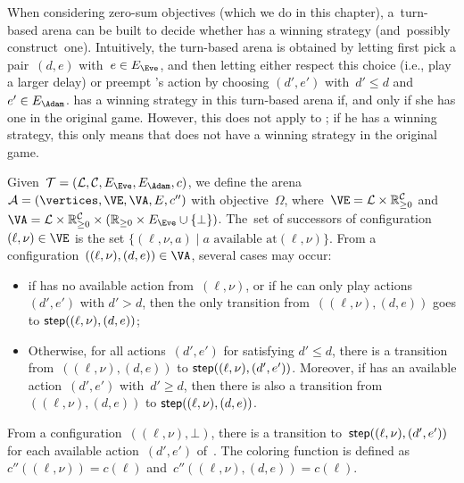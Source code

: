 \begin{remark}
  When considering zero-sum objectives (which we do in this chapter),
a~turn-based arena can be built to decide whether \Eve has a winning
strategy (and~possibly construct~one).  Intuitively, the turn-based
arena is obtained by letting \Eve first pick a pair~$(d,e)$ with~$e
\in \EE$, and then letting \Adam either respect this choice (i.e.,
play a larger delay) or preempt \Eve's action by choosing $(d',e')$
with~$d' \leq d$ and~$e' \in \EA$.
\Eve has a winning strategy in this turn-based arena if, and only if she has one in the original game.
However, this does not apply to \Adam; if he has a winning strategy, this only means that \Eve
does not have a winning strategy in the original game.

Given~$\calT = (\Locs, \Clocks,\EE,\EA, c)$, we define the arena~$\TA
= (\vertices,\VE,\VA,E, c'')$ 
with objective~$\Omega$, where~$\VE = \Locs\times \Realnn^\Clocks$ and
$\VA=\Locs\times\Realnn^\Clocks\times(\Realnn \times \EE
\cup\{\bot\})$.  The~set of successors of configuration~$(\ell,\nu)
\in \VE$ is the set $\{(\ell,\nu,a)\mid a \text{ available at
}(\ell,\nu)\}$.
From a configuration~$((\ell,\nu),(d,e))\in\VA$, several cases may
occur:
\begin{itemize}
\item if \Adam has no available action from~$(\ell,\nu)$, or if he can
  only play actions~$(d',e')$ with $d'>d$, then the only transition
  from~$((\ell,\nu),(d,e))$ goes to $\mathsf{step}((\ell,\nu),(d,e))$;
\item Otherwise, for all actions~$(d',e')$ for \Adam satisfying $d'\leq d$,
  there is a transition from~$((\ell,\nu),(d,e))$
  to $\mathsf{step}((\ell,\nu),(d',e'))$.
  Moreover, if \Adam has an available action~$(d',e')$ with~$d'\geq d$,
  then there is also a transition
  from~$((\ell,\nu),(d,e))$ to $\mathsf{step}((\ell,\nu),(d,e))$.
\end{itemize}
From a configuration~$((\ell,\nu),\bot)$, there is a transition
to~$\mathsf{step}((\ell,\nu),(d',e'))$ for each available action~$(d',e')$
of~\Adam.
The coloring function is defined as~$c''((\ell,\nu)) = c(\ell)$
and~$c''((\ell,\nu),(d,e)) = c(\ell)$.


\end{remark}
